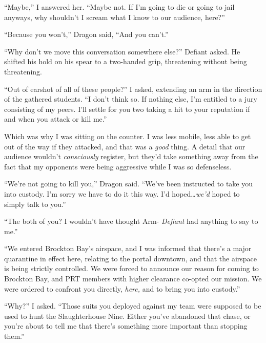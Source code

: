 ``Maybe,'' I answered her.  ``Maybe not.  If I'm going to die or going to jail anyways, why shouldn't I scream what I know to our audience, here?''



``Because you won't,'' Dragon said, ``And you can't.''



``Why don't we move this conversation somewhere else?'' Defiant asked.  He shifted his hold on his spear to a two-handed grip, threatening without being threatening.



``Out of earshot of all of these people?'' I asked, extending an arm in the direction of the gathered students.  ``I don't think so.  If nothing else, I'm entitled to a jury consisting of my peers.  I'll settle for you two taking a hit to your reputation if and when you attack or kill me.''



Which was why I was sitting on the counter.  I was less mobile, less able to get out of the way if they attacked, and that was a \emph{good} thing.  A detail that our audience wouldn't \emph{consciously} register, but they'd take something away from the fact that my opponents were being aggressive while I was so defenseless.



``We're not going to kill you,'' Dragon said.  ``We've been instructed to take you into custody.  I'm sorry we have to do it this way.  I'd hoped\ldots \emph{we'd }hoped to simply talk to you.''



``The both of you?  I wouldn't have thought Arm- \emph{Defiant} had anything to say to me.''



``We entered Brockton Bay's airspace, and I was informed that there's a major quarantine in effect here, relating to the portal downtown, and that the airspace is being strictly controlled.  We were forced to announce our reason for coming to Brockton Bay, and PRT members with higher clearance co-opted our mission.  We were ordered to confront you directly, \emph{here, }and to bring you into custody.''



``Why?'' I asked.  ``Those suits you deployed against my team were supposed to be used to hunt the Slaughterhouse Nine.  Either you've abandoned that chase, or you're about to tell me that there's something more important than stopping them.''



